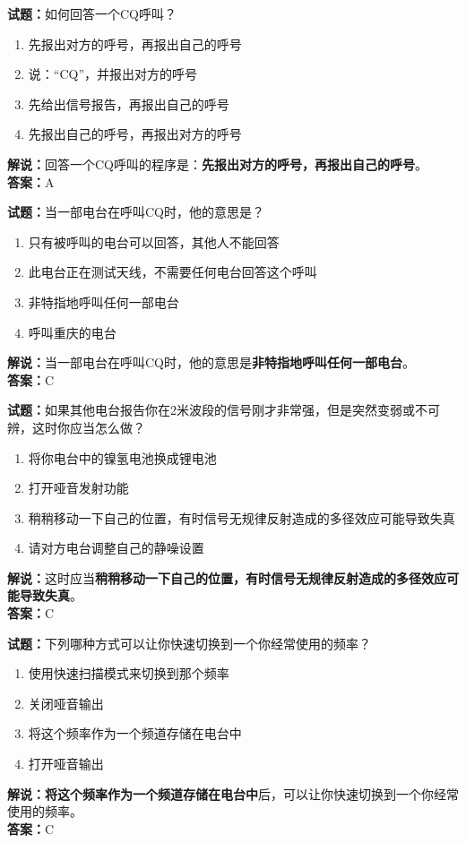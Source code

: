 \documentclass{ctexbook}
\begin{document}
\bigskip


\noindent\textbf{试题：}如何回答一个CQ呼叫？
\begin{enumerate}[leftmargin=3em]
\item 先报出对方的呼号，再报出自己的呼号
\item 说：“CQ”，并报出对方的呼号
\item 先给出信号报告，再报出自己的呼号
\item 先报出自己的呼号，再报出对方的呼号
\end{enumerate}
\noindent\textbf{解说：}回答一个CQ呼叫的程序是：\textbf{先报出对方的呼号，再报出自己的呼号}。\\\noindent\textbf{答案：}A



\bigskip


\noindent\textbf{试题：}当一部电台在呼叫CQ时，他的意思是？
\begin{enumerate}[leftmargin=3em]
\item 只有被呼叫的电台可以回答，其他人不能回答
\item 此电台正在测试天线，不需要任何电台回答这个呼叫
\item 非特指地呼叫任何一部电台
\item 呼叫重庆的电台
\end{enumerate}
\noindent\textbf{解说：}当一部电台在呼叫CQ时，他的意思是\textbf{非特指地呼叫任何一部电台}。\\\noindent\textbf{答案：}C




\bigskip


\noindent\textbf{试题：}如果其他电台报告你在2米波段的信号刚才非常强，但是突然变弱或不可辨，这时你应当怎么做？
\begin{enumerate}[leftmargin=3em]
\item 将你电台中的镍氢电池换成锂电池
\item 打开哑音发射功能
\item 稍稍移动一下自己的位置，有时信号无规律反射造成的多径效应可能导致失真
\item 请对方电台调整自己的静噪设置
\end{enumerate}
\noindent\textbf{解说：}这时应当\textbf{稍稍移动一下自己的位置，有时信号无规律反射造成的多径效应可能导致失真}。\\\noindent\textbf{答案：}C



\bigskip


\noindent\textbf{试题：}下列哪种方式可以让你快速切换到一个你经常使用的频率？
\begin{enumerate}[leftmargin=3em]
\item 使用快速扫描模式来切换到那个频率
\item 关闭哑音输出
\item 将这个频率作为一个频道存储在电台中
\item 打开哑音输出
\end{enumerate}
\noindent\textbf{解说：}\textbf{将这个频率作为一个频道存储在电台中}后，可以让你快速切换到一个你经常使用的频率。\\\noindent\textbf{答案：}C
\end{document}
